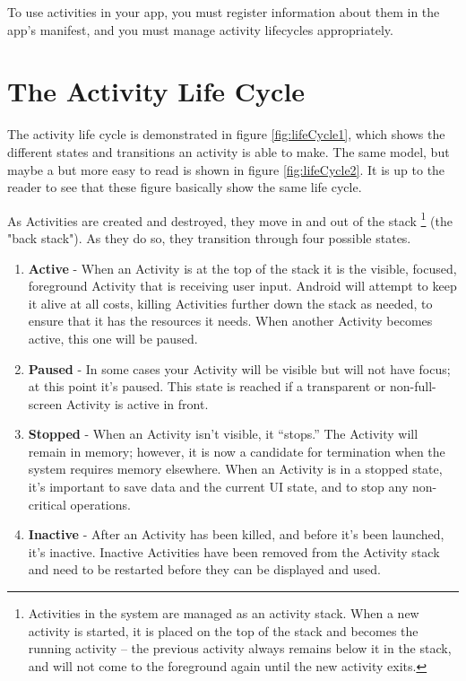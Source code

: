 To use activities in your app, you must register information about them in the app’s manifest, and you must manage activity lifecycles appropriately. 

\section{The Activity Life Cycle}
The activity life cycle is demonstrated in figure \ref{fig:lifeCycle1}, which shows the different states and transitions an activity is able to make. The same model, but maybe a but more easy to read is shown in figure \ref{fig:lifeCycle2}. It is up to the reader to see that these figure basically show the same life cycle. 

As Activities are created and destroyed, they move in and out of the stack \footnote{Activities in the system are managed as an activity stack. When a new activity is started, it is placed on the top of the stack and becomes the running activity -- the previous activity always remains below it in the stack, and will not come to the foreground again until the new activity exits.} (the "back stack"). As they do so, they transition through four possible states.

\begin{enumerate}
	\item \textbf{Active} - When an Activity is at the top of the stack it is the visible, focused, foreground Activity that is receiving user input. Android will attempt to keep it alive at all costs, killing Activities further down the stack as needed, to ensure that it has the resources it needs. When another Activity becomes active, this one will be paused.
	\item \textbf{Paused} - In some cases your Activity will be visible but will not have focus; at this point it’s paused. This state is reached if a transparent or non-full-screen Activity is active in front.
	\item \textbf{Stopped} - When an Activity isn’t visible, it “stops.” The Activity will remain in memory; however, it is now a candidate for termination when the system requires memory elsewhere. When an Activity is in a stopped state, it’s important to save data and the current UI state, and to stop any non-critical operations.
	\item \textbf{Inactive} - After an Activity has been killed, and before it’s been launched, it’s inactive. Inactive Activities have been removed from the Activity stack and need to be restarted before they can be displayed and used.
\end{enumerate}

